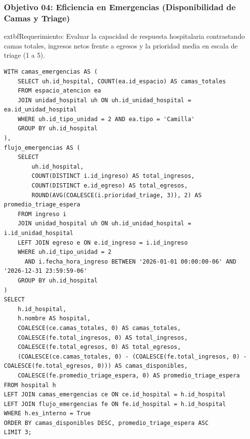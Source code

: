 \documentclass[11pt,a4paper]{article}
\begin{document}
\subsubsection{Objetivo 04: Eficiencia en Emergencias (Disponibilidad de Camas y Triage)}
	extbf{Requerimiento:} Evaluar la capacidad de respuesta hospitalaria contrastando camas totales, ingresos netos frente a egresos y la prioridad media en escala de triage (1 a 5).
\begin{lstlisting}[style=sqlstyle]
WITH camas_emergencias AS (
    SELECT uh.id_hospital, COUNT(ea.id_espacio) AS camas_totales
    FROM espacio_atencion ea
    JOIN unidad_hospital uh ON uh.id_unidad_hospital = ea.id_unidad_hospital
    WHERE uh.id_tipo_unidad = 2 AND ea.tipo = 'Camilla'
    GROUP BY uh.id_hospital
),
flujo_emergencias AS (
    SELECT 
        uh.id_hospital,
        COUNT(DISTINCT i.id_ingreso) AS total_ingresos,
        COUNT(DISTINCT e.id_egreso) AS total_egresos,
        ROUND(AVG(COALESCE(i.prioridad_triage, 3)), 2) AS promedio_triage_espera
    FROM ingreso i
    JOIN unidad_hospital uh ON uh.id_unidad_hospital = i.id_unidad_hospital
    LEFT JOIN egreso e ON e.id_ingreso = i.id_ingreso
    WHERE uh.id_tipo_unidad = 2
      AND i.fecha_hora_ingreso BETWEEN '2026-01-01 00:00:00-06' AND '2026-12-31 23:59:59-06'
    GROUP BY uh.id_hospital
)
SELECT 
    h.id_hospital,
    h.nombre AS hospital,
    COALESCE(ce.camas_totales, 0) AS camas_totales,
    COALESCE(fe.total_ingresos, 0) AS total_ingresos,
    COALESCE(fe.total_egresos, 0) AS total_egresos,
    (COALESCE(ce.camas_totales, 0) - (COALESCE(fe.total_ingresos, 0) - COALESCE(fe.total_egresos, 0))) AS camas_disponibles,
    COALESCE(fe.promedio_triage_espera, 0) AS promedio_triage_espera
FROM hospital h
LEFT JOIN camas_emergencias ce ON ce.id_hospital = h.id_hospital
LEFT JOIN flujo_emergencias fe ON fe.id_hospital = h.id_hospital
WHERE h.es_interno = True
ORDER BY camas_disponibles DESC, promedio_triage_espera ASC
LIMIT 3;
\end{lstlisting}
\end{document}
